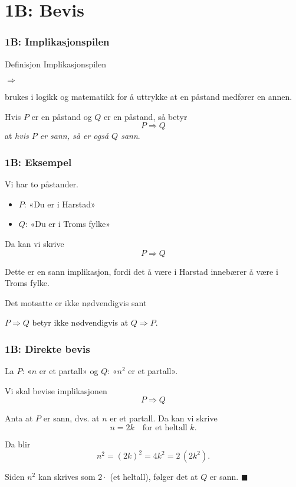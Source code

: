 \section{1B: Bevis}

\blueheader
\begin{frame}
\frametitle{1B: Implikasjonspilen}

\begin{blue*}{Definisjon}
Implikasjonspilen 
\begin{center}
$\Rightarrow$ 
\end{center}
brukes i logikk og matematikk for å uttrykke at en påstand medfører en annen.

\medskip
Hvis $P$ er en påstand og $Q$ er en påstand, så betyr
\[
P \Rightarrow Q
\]
at \textit{hvis $P$ er sann, så er også $Q$ sann}.

\end{blue*}

\end{frame}


\blueheader
\begin{frame}
\frametitle{1B: Eksempel}

Vi har to påstander.

\medskip
\begin{itemize}
    \item[] $P$: «Du er i Harstad» \\
    \item[] $Q$: «Du er i Troms fylke»
\end{itemize}


\medskip
Da kan vi skrive
\[
P \Rightarrow Q
\]

Dette er en sann implikasjon, fordi det å være i Harstad innebærer å være i Troms fylke.


\begin{red*}{Det motsatte er ikke nødvendigvis sant}
  
$P \Rightarrow Q$ betyr ikke nødvendigvis at $Q \Rightarrow P$.
\end{red*}

\end{frame}


\begin{frame}
\frametitle{1B: Direkte bevis}


La $P$: «$n$ er et partall»  
og $Q$: «$n^2$ er et partall».

\medskip
Vi skal bevise implikasjonen
\[
P \Rightarrow Q
\]

\medskip
Anta at $P$ er sann, dvs. at $n$ er et partall.  
Da kan vi skrive
\[
n = 2k \quad \text{for et heltall } k.
\]

Da blir
\[
n^2 = (2k)^2 = 4k^2 = 2\,(2k^2).
\]

\medskip
Siden $n^2$ kan skrives som $2 \cdot$ (et heltall), følger det at $Q$ er sann.  
\hfill$\blacksquare$


\end{frame}


